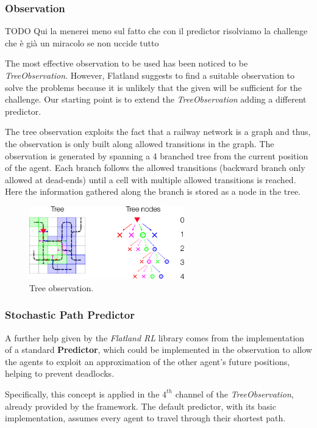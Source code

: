 \documentclass[12pt]{article}
\begin{document}
\subsubsection{Observation}

TODO Qui la menerei meno sul fatto che con il predictor risolviamo la challenge che è già un miracolo se non uccide tutto

The most effective observation to be used has been noticed to be \textit{TreeObservation}. However, Flatland suggests to find a suitable observation to solve the problems because it is unlikely that the given will be sufficient for the challenge. Our starting point is to extend the \textit{TreeObservation} adding a different predictor.  

The tree observation exploits the fact that a railway network is a graph and thus, the observation is only built along allowed transitions in the graph. The observation is generated by spanning a 4 branched tree from the current position of the agent. Each branch follows the allowed transitions (backward branch only allowed at dead-ends) until a cell with multiple allowed transitions is reached. Here the information gathered along the branch is stored as a node in the tree.

\begin{figure}[H]
\centering
\includegraphics[width=0.6\textwidth]{res/tree_obs.png}
\caption{\label{fig:Views}Tree observation.}
\end{figure}

\subsubsection{Stochastic Path Predictor}
A further help given by the \textit{Flatland RL} library comes from the implementation of a standard \textbf{Predictor}, which could be implemented in the observation to allow the agents to exploit an approximation of the other agent's future positions, helping to prevent deadlocks.

Specifically, this concept is applied in the $4^{th}$ channel of the \textit{TreeObservation}, already provided by the framework. The default predictor, with its basic implementation, assumes every agent to travel through their shortest path.
 
\end{document}
